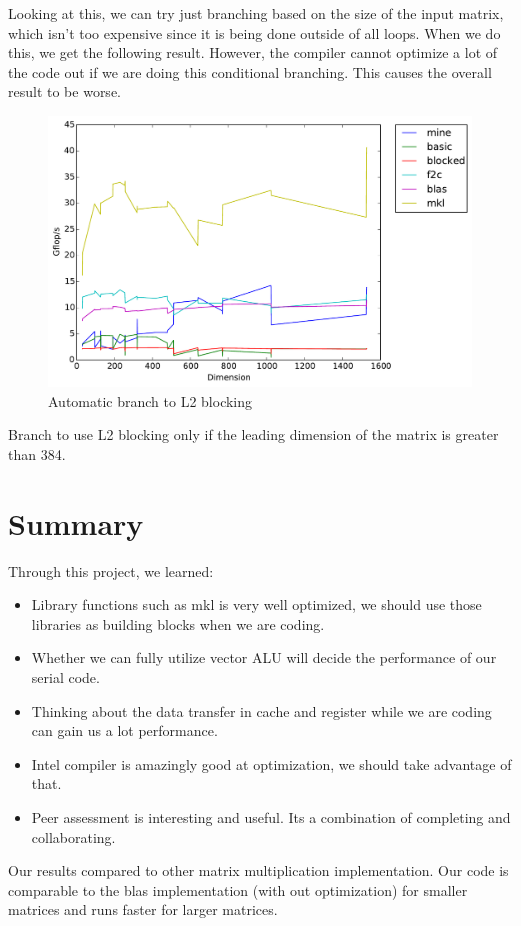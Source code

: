 \documentclass[11pt]{article}
\begin{document}
        Looking at this, we can try just branching based on the size of the input matrix, which isn't too expensive since it is being done outside of all loops. When we do this, we get the following result. However, the compiler cannot optimize a lot of the code out if we are doing this conditional branching. This causes the overall result to be worse.
        \begin{figure}[H]
            \centering
            \includegraphics[width=4.5in]{timing_L2_2.pdf}
            \caption{Automatic branch to L2 blocking}
        \end{figure}
		Branch to use L2 blocking only if the leading dimension of the matrix is greater than 384.
        \clearpage
    \section{Summary}
        
    Through this project, we learned:
    \begin{itemize}
        \item Library functions such as mkl is very well optimized, we should use those libraries as building blocks when we are coding.
        \item Whether we can fully utilize vector ALU will decide the performance of our serial code.
        \item Thinking about the data transfer in cache and register while we are coding can gain us a lot performance.
        \item Intel compiler is amazingly good at optimization, we should take advantage of that.
        \item Peer assessment is interesting and useful. Its a combination of completing and collaborating.
    \end{itemize}

    Our results compared to other matrix multiplication implementation. Our code is comparable to the blas implementation (with out optimization) for smaller matrices and runs faster for larger matrices.
\end{document}
